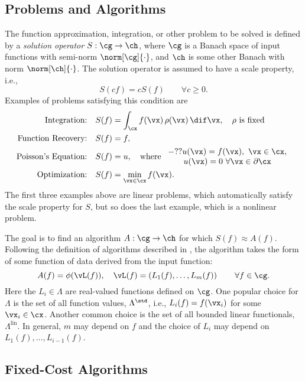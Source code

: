 \documentclass[final]{elsarticle}
\DeclareMathOperator{\lin}{lin}
\theoremstyle{definition}
\theoremstyle{remark}
\begin{document}
\subsection{Problems and Algorithms} The function approximation, integration, or other problem to be solved is defined by a \emph{solution operator} $S:\cg \to \ch$, where $\cg$ is a Banach space of input functions with semi-norm $\norm[\cg]{\cdot}$, and $\ch$ is some other Banach with norm $\norm[\ch]{\cdot}$. The solution operator is assumed to have a scale property, i.e., 
\[
S(cf) = cS(f) \qquad \forall c\ge 0.
\]
Examples of problems satisfying this condition are 
\begin{align*}
\text{Integration:} \quad & S(f) = \int_{\cx} f(\vx) \, \rho(\vx) \, \dif \vx, \quad \rho \text{ is fixed}\\
\text{Function Recovery:} \quad & S(f) = f, \\
\text{Poisson's Equation:} \quad & S(f) = u, \quad \text{where } \begin{array}{c} -?? u(\vx) = f(\vx), \ \vx \in \cx, \\ u(\vx)=0 \ \forall \vx \in \partial \cx\end{array} \\
\text{Optimization:} \quad & S(f) = \min_{\vx \in \cx} f(\vx).
\end{align*}
The first three examples above are linear problems, which automatically satisfy the scale property for $S$, but so does the last example, which is a nonlinear problem.

The goal is to find an algorithm $A:\cg \to \ch$ for which $S(f) \approx A(f)$. Following the definition of algorithms described in \cite[Section 3.2]{TraWasWoz88}, the algorithm takes the form of some function of data derived from the input function:
\begin{equation}
\label{algoform}
A(f) =  \phi(\vL(f)), \quad \vL(f) = \left(L_1(f), \ldots, L_m(f)\right) \qquad \forall f \in \cg.
\end{equation}
Here the $L_i \in \Lambda$ are real-valued functions defined on $\cg$.  One popular choice for $\Lambda$ is the set of all function values, $\Lambda^{\std}$, i.e., $L_i(f) = f(\vx_i)$ for some $\vx_i \in \cx$.  Another common choice is the set of all bounded linear functionals, $\Lambda^{\lin}$.  In general, $m$ may depend on $f$ and the choice of $L_i$ may depend on $L_1(f), \ldots, L_{i-1}(f)$.

\subsection{Fixed-Cost Algorithms}
\end{document}
